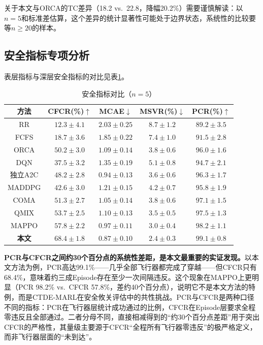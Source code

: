 \documentclass[12pt,a4paper,UTF8]{ctexart}
\begin{document}
关于本文与ORCA的TC差异（18.2 vs.\ 22.8，降幅20.2\%）需要谨慎解读：以$n=5$和标准差估算，这个差异的统计显著性可能处于边界状态，系统性的比较要等$n\geq20$的样本。

\subsection{安全指标专项分析}

表层指标与深层安全指标的对比见表\ref{tab:safety}。

\begin{table}[H]
    \centering
    \caption{安全指标对比（$n=5$）}
    \label{tab:safety}
    \begin{tabular}{ccccc}
        \toprule
        \textbf{方法} & \textbf{CFCR(\%)$\uparrow$} & \textbf{MCAE$\downarrow$} & \textbf{MSVR(\%)$\downarrow$} & \textbf{PCR(\%)$\uparrow$} \\
        \midrule
        RR & $12.3\pm4.1$ & $2.03\pm0.25$ & $8.7\pm1.2$ & $89.2\pm3.5$ \\
        FCFS & $18.7\pm3.6$ & $1.85\pm0.22$ & $7.4\pm1.0$ & $91.5\pm2.8$ \\
        ORCA & $50.2\pm3.0$ & $1.09\pm0.14$ & $3.8\pm0.6$ & $96.0\pm1.6$ \\
        DQN & $37.5\pm3.2$ & $1.35\pm0.19$ & $5.1\pm0.8$ & $94.7\pm2.1$ \\
        独立A2C & $48.2\pm2.8$ & $0.94\pm0.13$ & $3.6\pm0.6$ & $96.3\pm1.7$ \\
        MADDPG & $42.6\pm3.0$ & $1.21\pm0.15$ & $4.2\pm0.7$ & $95.8\pm1.9$ \\
        COMA & $51.3\pm2.7$ & $1.05\pm0.14$ & $3.8\pm0.6$ & $97.1\pm1.5$ \\
        QMIX & $53.7\pm2.5$ & $1.10\pm0.13$ & $3.5\pm0.5$ & $97.5\pm1.3$ \\
        MAPPO & $57.8\pm2.2$ & $0.97\pm0.11$ & $3.0\pm0.4$ & $98.2\pm1.1$ \\
        \textbf{本文} & $\mathbf{68.4\pm1.8}$ & $\mathbf{0.87\pm0.10}$ & $\mathbf{2.4\pm0.3}$ & $\mathbf{99.1\pm0.8}$ \\
        \bottomrule
    \end{tabular}
\end{table}

\textbf{PCR与CFCR之间约30个百分点的系统性差距，是本文最重要的实证发现。}以本文方法为例，PCR高达99.1\%——几乎全部飞行器都完成了穿越——但CFCR只有68.4\%，意味着约三成Episode存在至少一次间隔违反。这个现象在MAPPO上更明显（PCR 98.2\% vs.\ CFCR 57.8\%，差约40个百分点），说明它不是本文方法的特例，而是CTDE-MARL在安全攸关评估中的共性挑战。PCR与CFCR是两种口径不同的指标：PCR在飞行器层统计成功通过的比例，CFCR在Episode层要求全程零违反且全部通过。二者分母不同，直接相减得到的“约30个百分点差距”用于突出CFCR的严格性，其量级主要源于CFCR“全程所有飞行器零违反”的极严格定义，而非飞行器层面的“未到达”。
\end{document}
